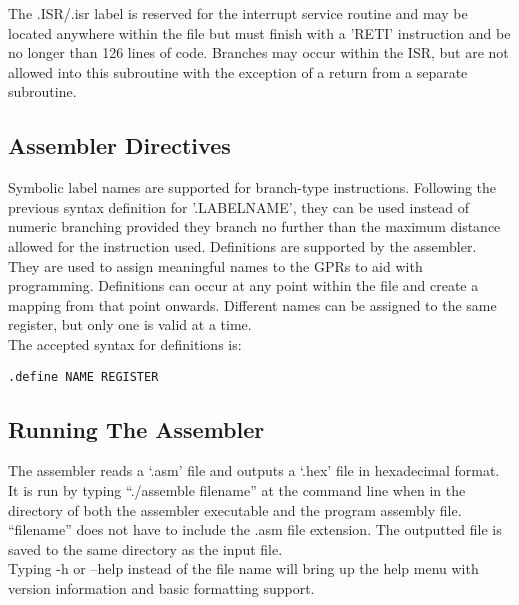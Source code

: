 \noindent The .ISR/.isr label is reserved for the interrupt service routine and may be located anywhere within the file but must finish with a 'RETI' instruction and be no longer than 126 lines of code. Branches may occur within the ISR, but are not allowed into this subroutine with the exception of a return from a separate subroutine.\\

\subsection{Assembler Directives}
Symbolic label names are supported for branch-type instructions. Following the previous syntax definition for '.LABELNAME', they can be used instead of numeric branching provided they branch no further than the maximum distance allowed for the instruction used. 
Definitions are supported by the assembler. 
They are used to assign meaningful names to the GPRs to aid with programming.
Definitions can occur at any point within the file and create a mapping from that point onwards. 
Different names can be assigned to the same register, but only one is valid at a time. \\


\noindent The accepted syntax for definitions is:

\begin{center}\texttt{.define NAME REGISTER}\end{center}

\subsection{Running The Assembler}
The assembler reads a `.asm' file and outputs a `.hex' file in hexadecimal format. 
It is run by typing ``./assemble filename'' at the command line when in the directory of both the assembler executable and the program assembly file. ``filename'' does not have to include the .asm file extension. 
The outputted file is saved to the same directory as the input file. \\
\noindent Typing -h or --help instead of the file name will bring up the help menu with version information and basic formatting support. 

\newpage
